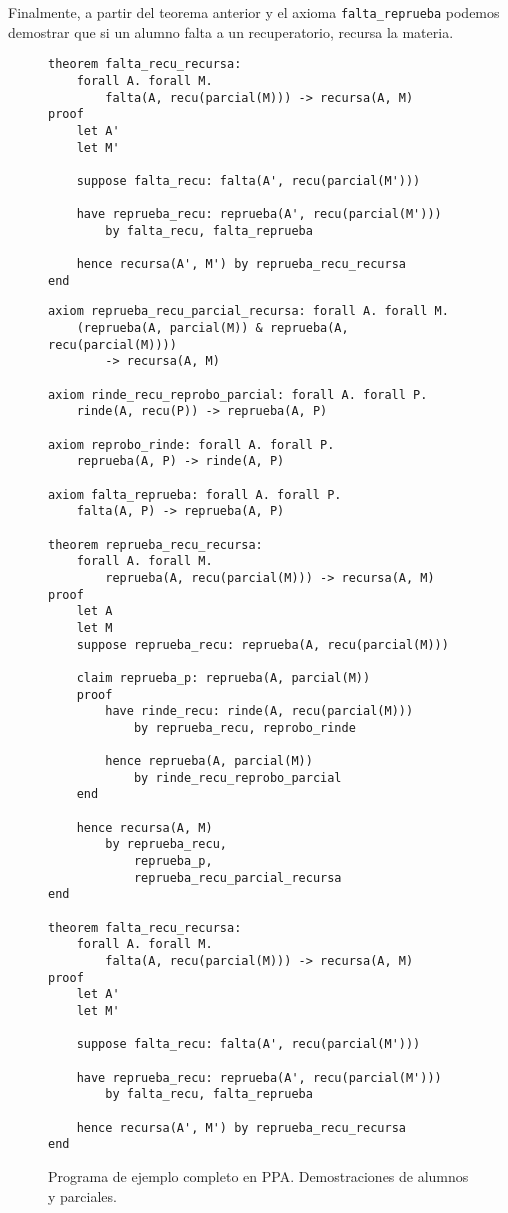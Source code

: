 Finalmente, a partir del teorema anterior y el axioma \texttt{falta\_reprueba}
podemos demostrar que si un alumno falta a un recuperatorio, recursa la materia.

\begin{figure}[H]
\begin{lstlisting}[language=PPA]
theorem falta_recu_recursa:
    forall A. forall M.
        falta(A, recu(parcial(M))) -> recursa(A, M)
proof
    let A'
    let M'

    suppose falta_recu: falta(A', recu(parcial(M')))

    have reprueba_recu: reprueba(A', recu(parcial(M')))
        by falta_recu, falta_reprueba

    hence recursa(A', M') by reprueba_recu_recursa
end
\end{lstlisting}
\end{figure}

\begin{figure}[H]
\begin{lstlisting}[language=PPA]
axiom reprueba_recu_parcial_recursa: forall A. forall M.
    (reprueba(A, parcial(M)) & reprueba(A, recu(parcial(M))))
        -> recursa(A, M)

axiom rinde_recu_reprobo_parcial: forall A. forall P.
    rinde(A, recu(P)) -> reprueba(A, P)

axiom reprobo_rinde: forall A. forall P.
    reprueba(A, P) -> rinde(A, P)

axiom falta_reprueba: forall A. forall P.
    falta(A, P) -> reprueba(A, P)

theorem reprueba_recu_recursa:
    forall A. forall M.
        reprueba(A, recu(parcial(M))) -> recursa(A, M)
proof
    let A
    let M
    suppose reprueba_recu: reprueba(A, recu(parcial(M)))

    claim reprueba_p: reprueba(A, parcial(M))
    proof
        have rinde_recu: rinde(A, recu(parcial(M)))
            by reprueba_recu, reprobo_rinde

        hence reprueba(A, parcial(M))
            by rinde_recu_reprobo_parcial        
    end

    hence recursa(A, M)
        by reprueba_recu,
            reprueba_p,
            reprueba_recu_parcial_recursa
end

theorem falta_recu_recursa:
    forall A. forall M.
        falta(A, recu(parcial(M))) -> recursa(A, M)
proof
    let A'
    let M'

    suppose falta_recu: falta(A', recu(parcial(M')))

    have reprueba_recu: reprueba(A', recu(parcial(M')))
        by falta_recu, falta_reprueba

    hence recursa(A', M') by reprueba_recu_recursa
end
\end{lstlisting}
    \caption{Programa de ejemplo completo en PPA. Demostraciones de alumnos y parciales.}
\end{figure}

